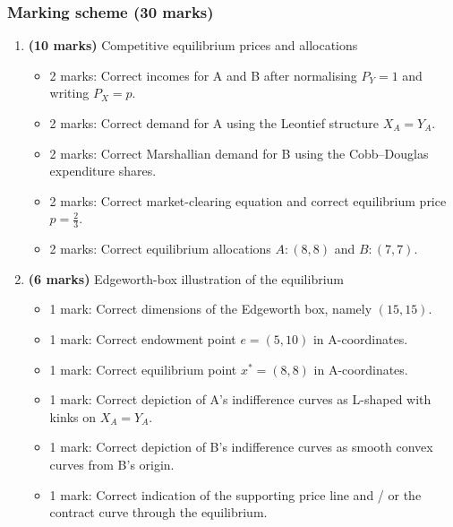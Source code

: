 \documentclass[12pt]{article}
\begin{document}
\newpage
\subsubsection{Marking scheme (30 marks)}

\begin{enumerate}[label=(\alph*)]
    \item \textbf{(10 marks)} Competitive equilibrium prices and allocations
    \begin{itemize}
        \item 2 marks: Correct incomes for A and B after normalising \(P_Y=1\) and writing \(P_X=p\).
        \item 2 marks: Correct demand for A using the Leontief structure \(X_A=Y_A\).
        \item 2 marks: Correct Marshallian demand for B using the Cobb--Douglas expenditure shares.
        \item 2 marks: Correct market-clearing equation and correct equilibrium price \(p=\frac23\).
        \item 2 marks: Correct equilibrium allocations \(A:(8,8)\) and \(B:(7,7)\).
    \end{itemize}

    \item \textbf{(6 marks)} Edgeworth-box illustration of the equilibrium
    \begin{itemize}
        \item 1 mark: Correct dimensions of the Edgeworth box, namely \((15,15)\).
        \item 1 mark: Correct endowment point \(e=(5,10)\) in A-coordinates.
        \item 1 mark: Correct equilibrium point \(x^*=(8,8)\) in A-coordinates.
        \item 1 mark: Correct depiction of A's indifference curves as L-shaped with kinks on \(X_A=Y_A\).
        \item 1 mark: Correct depiction of B's indifference curves as smooth convex curves from B's origin.
        \item 1 mark: Correct indication of the supporting price line and / or the contract curve through the equilibrium.
    \end{itemize}


\end{enumerate}
\end{document}
